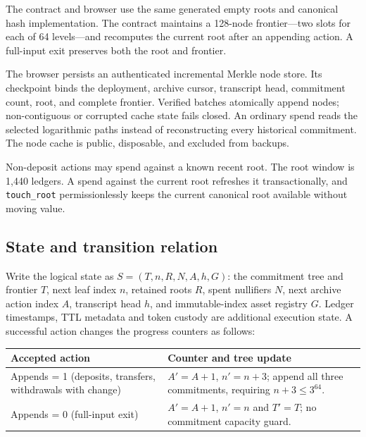 \documentclass[11pt,letterpaper]{article}
\begin{document}
The contract and browser use the same generated empty roots and
canonical hash implementation. The contract maintains a 128-node
frontier---two slots for each of 64 levels---and recomputes the current
root after an appending action. A full-input exit preserves both the
root and frontier.

The browser persists an authenticated incremental Merkle node store. Its
checkpoint binds the deployment, archive cursor, transcript head,
commitment count, root, and complete frontier. Verified batches
atomically append nodes; non-contiguous or corrupted cache state fails
closed. An ordinary spend reads the selected logarithmic paths instead
of reconstructing every historical commitment. The node cache is public,
disposable, and excluded from backups.

Non-deposit actions may spend against a known recent root. The root
window is 1,440 ledgers. A spend against the current root refreshes it
transactionally, and \texttt{touch\_root} permissionlessly keeps the
current canonical root available without moving value.

\subsection{State and transition
relation}\label{state-and-transition-relation}

Write the logical state as \(S=(T,n,R,N,A,h,G)\): the commitment tree
and frontier \(T\), next leaf index \(n\), retained roots \(R\), spent
nullifiers \(N\), next archive action index \(A\), transcript head
\(h\), and immutable-index asset registry \(G\). Ledger timestamps, TTL
metadata and token custody are additional execution state. A successful
action changes the progress counters as follows:

{\def\LTcaptype{none} %
\begin{longtable}[]{@{}
  >{\raggedright\arraybackslash}p{}
  >{\raggedright\arraybackslash}p{}@{}}
\toprule\noalign{}
\begin{minipage}[b]{\linewidth}\raggedright
Accepted action
\end{minipage} & \begin{minipage}[b]{\linewidth}\raggedright
Counter and tree update
\end{minipage} \\
\midrule\noalign{}
\endhead
\bottomrule\noalign{}
\endlastfoot
Appends = 1 (deposits, transfers, withdrawals with change) & \(A'=A+1\),
\(n'=n+3\); append all three commitments, requiring
\(n+3 \leq 3^{64}\). \\
Appends = 0 (full-input exit) & \(A'=A+1\), \(n'=n\) and \(T'=T\); no
commitment capacity guard. \\
\end{longtable}
}
\end{document}
